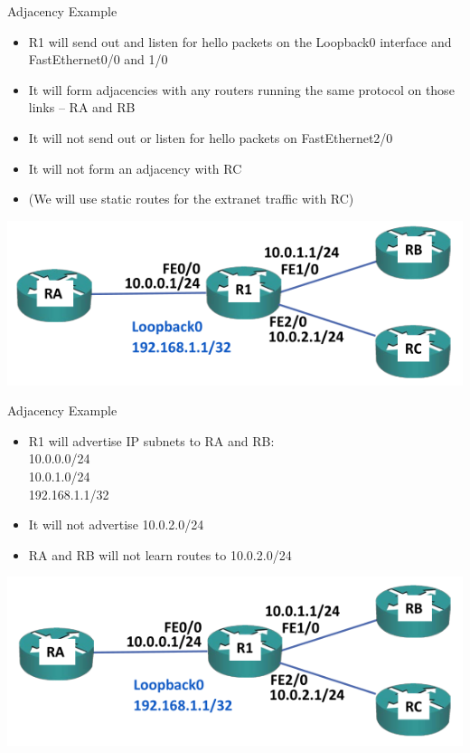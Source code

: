 \documentclass[pdflatex,compress,mathserif]{beamer}
\begin{document}
\begin{frame}{Adjacency Example}
	\begin{itemize}
		\item R1 will send out and listen for hello packets on the Loopback0 interface
and FastEthernet0/0 and 1/0
		\item It will form adjacencies with any routers running the same protocol on
those links – RA and RB
		\item It will not send out or listen for hello packets on FastEthernet2/0
		\item It will not form an adjacency with RC
		\item (We will use static routes for the extranet traffic with RC)
	\end{itemize}
	\begin{center}
		\includegraphics[width=0.6\linewidth]{img/img37}
	\end{center}
\end{frame}

\begin{frame}{Adjacency Example}
	\begin{itemize}
		\item R1 will advertise IP subnets to RA and RB:
\\
		10.0.0.0/24
\\
		10.0.1.0/24
\\
		192.168.1.1/32
		\item It will not advertise 10.0.2.0/24
		\item RA and RB will not learn routes to 10.0.2.0/24
	\end{itemize}
	\begin{center}
		\includegraphics[width=0.6\linewidth]{img/img38}
	\end{center}
\end{frame}
\end{document}
